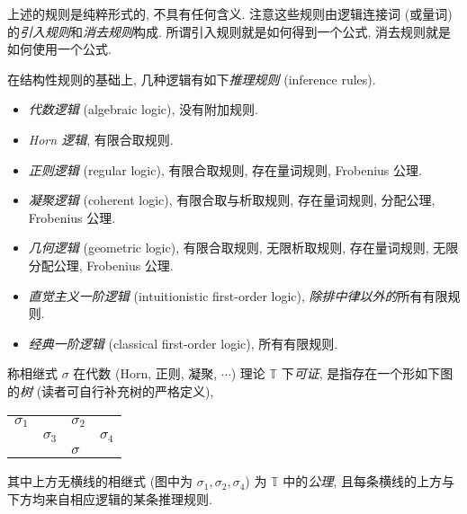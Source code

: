\begin{remark}
	{}
	上述的规则是纯粹形式的, 不具有任何含义.
	注意这些规则由逻辑连接词 (或量词) 的\emph{引入规则}和\emph{消去规则}构成. 所谓引入规则就是如何得到一个公式, 消去规则就是如何使用一个公式.
\end{remark}


\begin{definition}
	[label={inference-rules}]
	{}
	在结构性规则的基础上, 几种逻辑有如下\emph{推理规则} (inference rules).
	\begin{itemize}
		\item \emph{代数逻辑} (algebraic logic), 没有附加规则.
		\item \emph{Horn 逻辑}, 有限合取规则.
		\item \emph{正则逻辑} (regular logic), 有限合取规则, 存在量词规则, Frobenius 公理.
		\item \emph{凝聚逻辑} (coherent logic), 有限合取与析取规则, 存在量词规则, 分配公理, Frobenius 公理.
		\item \emph{几何逻辑} (geometric logic), 有限合取规则, 无限析取规则, 存在量词规则, 无限分配公理, Frobenius 公理.
		\item \emph{直觉主义一阶逻辑} (intuitionistic first-order logic), \emph{除排中律以外的}所有有限规则.
		\item \emph{经典一阶逻辑} (classical first-order logic), 所有有限规则.
	\end{itemize}
\end{definition}

\begin{definition}
	[label={first-order-provability}]
	{}
	称相继式 $\sigma$ 在代数 (Horn, 正则, 凝聚, $\cdots$) 理论 $\mathbb T$ 下\emph{可证},
	是指存在一个形如下图的\emph{树} (读者可自行补充树的严格定义),
	\begin{center}
		\begin{tabular}{llll}
			$\sigma_1$ &            & $\sigma_2$ &            \\ \cline{1-3}
			& $\sigma_3$ &            & $\sigma_4$ \\ \cline{2-4} 
			&            & $\sigma$ &           
		\end{tabular}
	\end{center}
	其中上方无横线的相继式 (图中为 $\sigma_1,\sigma_2,\sigma_4$) 为 $\mathbb T$ 中的\emph{公理}, 且每条横线的上方与下方均来自相应逻辑的某条推理规则.
\end{definition}

